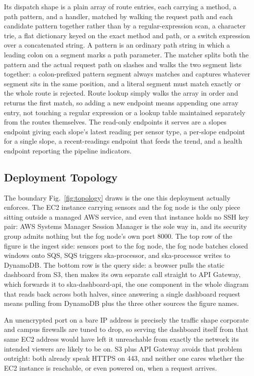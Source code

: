 \documentclass[conference]{IEEEtran}
\begin{document}
Its dispatch shape is a plain array of route entries, each carrying a method, a path pattern, and a handler, matched by walking the request path and each candidate pattern together rather than by a regular-expression scan, a character trie, a flat dictionary keyed on the exact method and path, or a switch expression over a concatenated string. A pattern is an ordinary path string in which a leading colon on a segment marks a path parameter. The matcher splits both the pattern and the actual request path on slashes and walks the two segment lists together: a colon-prefixed pattern segment always matches and captures whatever segment sits in the same position, and a literal segment must match exactly or the whole route is rejected. Route lookup simply walks the array in order and returns the first match, so adding a new endpoint means appending one array entry, not touching a regular expression or a lookup table maintained separately from the routes themselves. The read-only endpoints it serves are a slopes endpoint giving each slope's latest reading per sensor type, a per-slope endpoint for a single slope, a recent-readings endpoint that feeds the trend, and a health endpoint reporting the pipeline indicators.

\subsection{Deployment Topology}
The boundary Fig.~\ref{fig:topology} draws is the one this deployment actually enforces. The EC2 instance carrying sensors and the fog node is the only piece sitting outside a managed AWS service, and even that instance holds no SSH key pair: AWS Systems Manager Session Manager is the sole way in, and its security group admits nothing but the fog node's own port 8000. The top row of the figure is the ingest side: sensors post to the fog node, the fog node batches closed windows onto SQS, SQS triggers ska-processor, and ska-processor writes to DynamoDB. The bottom row is the query side: a browser pulls the static dashboard from S3, then makes its own separate call straight to API Gateway, which forwards it to ska-dashboard-api, the one component in the whole diagram that reads back across both halves, since answering a single dashboard request means pulling from DynamoDB plus the three other sources the figure names.

An unencrypted port on a bare IP address is precisely the traffic shape corporate and campus firewalls are tuned to drop, so serving the dashboard itself from that same EC2 address would have left it unreachable from exactly the network its intended viewers are likely to be on. S3 plus API Gateway avoids that problem outright: both already speak HTTPS on 443, and neither one cares whether the EC2 instance is reachable, or even powered on, when a request arrives.
\end{document}
